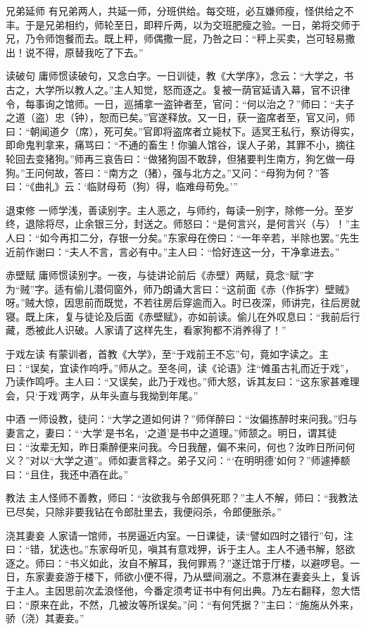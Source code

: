 \documentclass[12pt,UTF8]{ctexbook}
\begin{document}
兄弟延师
有兄弟两人，共延一师，分班供给。每交班，必互嫌师瘦，怪供给之不丰。于是兄弟相约，师轮至日，即秤斤两，以为交班肥瘦之验。一日，弟将交师于兄，乃令师饱餐而去。既上秤，师偶撒一屁，乃咎之曰：“秤上买卖，岂可轻易撒出！说不得，原替我吃了下去。”

读破句
庸师惯读破句，又念白字。一日训徒，教《大学序》，念云：“大学之，书古之，大学所以教人之。”主人知觉，怒而逐之。复被一荫官延请入幕，官不识律令，每事询之馆师。一日，巡捕拿一盗钟者至，官问：“何以治之？”师曰：“夫子之道（盗）忠（钟），恕而已矣。”官遂释放。又一日，获一盗席者至，官又问，师曰：“朝闻道夕（席），死可矣。”官即将盗席者立毙杖下。适冥王私行，察访得实，即命鬼判拿来，痛骂曰：“不通的畜生！你骗人馆谷，误人子弟，其罪不小，摘往轮回去变猪狗。”师再三哀告曰：“做猪狗固不敢辞，但猪要判生南方，狗乞做一母狗。”王问何故，答曰：“南方之（猪），强与北方之。”又问：“母狗为何？”答曰：“《曲礼》云：‘临财母苟（狗）得，临难母苟免。’”

退束修
一师学浅，善读别字。主人恶之，与师约，每读一别字，除修一分。至岁终，退除将尽，止余银三分，封送之。师怒曰：“是何言兴，是何言兴（与）！”主人曰：“如今再扣二分，存银一分矣。”东家母在傍曰：“一年辛若，半除也罢。”先生近前作谢曰：“夫人不言，言必有中。”主人曰：“恰好连这一分，干净拿进去。”

赤壁赋
庸师惯读别字。一夜，与徒讲论前后《赤壁）两赋，竟念“赋”字为“贼”字。适有偷儿潜伺窗外，师乃朗诵大言曰：“这前面《赤（作拆字）壁贼》呀。”贼大惊，因思前而既觉，不若往房后穿逾而入。时已夜深，师讲完，往后房就寝。既上床，复与徒论及后面《赤壁赋》，亦如前读。偷儿在外叹息曰：“我前后行藏，悉被此人识破。人家请了这样先生，看家狗都不消养得了！”

于戏左读
有蒙训者，首教《大学》，至“于戏前王不忘”句，竟如字读之。主曰：“误矣，宜读作呜呼。”师从之。至冬间，读《论语》注“傩虽古礼而近于戏”，乃读作鸣呼。主人曰：“又误矣，此乃于戏也。”师大怒，诉其友曰：“这东家甚难理会，只‘于戏’两字，从年头直与我拗到年尾。”

中酒
一师设教，徒问：“大学之道如何讲？”师佯醉曰：“汝偏拣醉时来问我。”归与妻言之，妻曰：“‘大学’是书名，‘之道’是书中之道理。”师颔之。明日，谓其徒曰：“汝辈无知，昨日乘醉便来问我。今日我醒，偏不来问，何也？汝昨日所问何义？”对以“大学之道”。师如妻言释之。弟子又问：“‘在明明德’如何？”师遽捧额曰：“且住，我还中酒在此。”

教法
主人怪师不善教，师曰：“汝欲我与令郎俱死耶？”主人不解，师曰：“我教法已尽矣，只除非要我钻在令郎肚里去，我便闷杀，令郎便胀杀。”

浇其妻妾
人家请一馆师，书房逼近内室。一日课徒，读“譬如四时之错行”句，注曰：“错，犹迭也。”东家母听见，嗔其有意戏狎，诉于主人。主人不通书解，怒欲逐之。师曰：“书义如此，汝自不解耳，我何罪焉？”遂迁馆于厅楼，以避啰皂。一日，东家妻妾游于楼下，师欲小便不得，乃从壁间溺之。不意淋在妻妾头上，复诉于主人。主因思前次孟浪怪他，今番定须考证书中有何出典。乃左右翻释，忽大悟曰：“原来在此，不然，几被汝等所误矣。”问：“有何凭据？”主曰：“施施从外来，骄（浇）其妻妾。”
\end{document}
